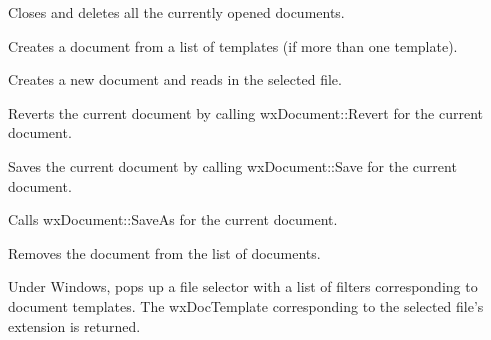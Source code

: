 \label{wxdocmanageronfilecloseall}


Closes and deletes all the currently opened documents.

\label{wxdocmanageronfilenew}


Creates a document from a list of templates (if more than one template).

\label{wxdocmanageronfileopen}


Creates a new document and reads in the selected file.

\label{wxdocmanageronfilerevert}


Reverts the current document by calling wxDocument::Revert for the current document.

\label{wxdocmanageronfilesave}


Saves the current document by calling wxDocument::Save for the current document.

\label{wxdocmanageronfilesaveas}


Calls wxDocument::SaveAs for the current document.

\label{wxdocmanagerremovedocument}


Removes the document from the list of documents.

\label{wxdocmanagerselectdocumentpath}


Under Windows, pops up a file selector with a list of filters corresponding to document templates.
The wxDocTemplate corresponding to the selected file's extension is returned.

